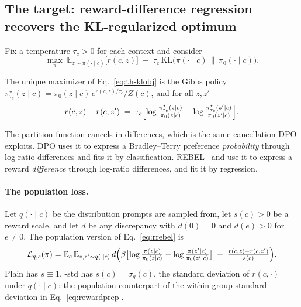 \subsection{The target: reward-difference regression recovers the KL-regularized optimum}
\label{sec:th-target}

Fix a temperature $\tau_c > 0$ for each context and consider
\begin{equation}
  \max_{\pi}\;
  \mathbb{E}_{z\sim\pi(\cdot\mid c)}\bigl[r(c,z)\bigr]
  \;-\; \tau_c\, \mathrm{KL}\bigl(\pi(\cdot\mid c)\,\|\,\pi_0(\cdot\mid c)\bigr).
  \label{eq:th-klobj}
\end{equation}

\begin{lemma}
\label{lem:gibbs}
The unique maximizer of Eq.~\eqref{eq:th-klobj} is the Gibbs policy
$\pi^\star_{\tau_c}(z\mid c) = \pi_0(z\mid c)\,e^{r(c,z)/\tau_c}/Z(c)$, and for
all $z, z'$
\begin{equation}
  r(c,z) - r(c,z') \;=\;
  \tau_c\Bigl[\log\tfrac{\pi^\star_{\tau_c}(z\mid c)}{\pi_0(z\mid c)}
            - \log\tfrac{\pi^\star_{\tau_c}(z'\mid c)}{\pi_0(z'\mid c)}\Bigr].
  \label{eq:th-diff}
\end{equation}
\end{lemma}

The partition function cancels in differences, which is the same cancellation
DPO exploits. DPO uses it to express a Bradley--Terry preference
\emph{probability} through log-ratio differences and fits it by
classification. REBEL~\citep{gao2024rebel} and \rrebel{} use it to express a
reward \emph{difference} through log-ratio differences, and fit it by
regression.

\paragraph{The population loss.}
Let $q(\cdot\mid c)$ be the distribution prompts are sampled from, let
$s(c) > 0$ be a reward scale, and let $d$ be any discrepancy with $d(0)=0$ and
$d(e) > 0$ for $e \neq 0$. The population version of Eq.~\eqref{eq:rrebel} is
\begin{equation}
  \mathcal{L}_{q,s}(\pi) =
  \mathbb{E}_c\,\mathbb{E}_{z,z'\sim q(\cdot\mid c)}\,
  d\Bigl(\beta\bigl[\log\tfrac{\pi(z\mid c)}{\pi_0(z\mid c)}
                   - \log\tfrac{\pi(z'\mid c)}{\pi_0(z'\mid c)}\bigr]
         \;-\; \tfrac{r(c,z) - r(c,z')}{s(c)}\Bigr).
  \label{eq:th-poploss}
\end{equation}
Plain \rrebel{} has $s \equiv 1$. \rrebel{}-std has
$s(c) = \sigma_q(c)$, the standard deviation of $r(c,\cdot)$ under
$q(\cdot\mid c)$: the population counterpart of the within-group standard
deviation in Eq.~\eqref{eq:rewardprep}.

